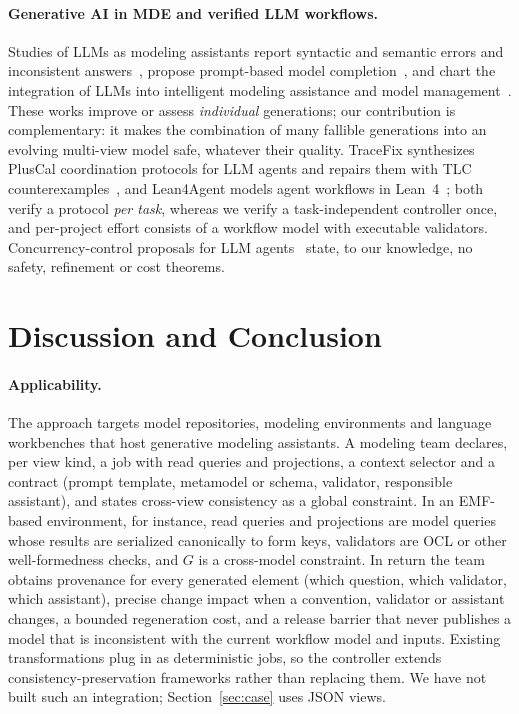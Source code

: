 \documentclass[pdflatex,sn-mathphys-num]{sn-jnl}
\theoremstyle{thmstyleone}%
\theoremstyle{thmstyletwo}%
\theoremstyle{thmstylethree}%
\begin{document}
\paragraph{Generative AI in MDE and verified LLM workflows.} Studies of LLMs as modeling assistants report syntactic and semantic errors and inconsistent answers~\cite{camara2023chatgpt}, propose prompt-based model completion~\cite{chaaben2023completion}, and chart the integration of LLMs into intelligent modeling assistance and model management~\cite{mussbacher2020assistance,dirocco2025llmmde}. These works improve or assess \emph{individual} generations; our contribution is complementary: it makes the combination of many fallible generations into an evolving multi-view model safe, whatever their quality. TraceFix synthesizes PlusCal coordination protocols for LLM agents and repairs them with TLC counterexamples~\cite{xia2026tracefix}, and Lean4Agent models agent workflows in Lean~4~\cite{wang2026lean4agent}; both verify a protocol \emph{per task}, whereas we verify a task-independent controller once, and per-project effort consists of a workflow model with executable validators. Concurrency-control proposals for LLM agents~\cite{yang2026concurrency,lyu2026coagent} state, to our knowledge, no safety, refinement or cost theorems.

\section{Discussion and Conclusion}\label{sec:conclusion}
\paragraph{Applicability.} The approach targets model repositories, modeling environments and language workbenches that host generative modeling assistants. A modeling team declares, per view kind, a job with read queries and projections, a context selector and a contract (prompt template, metamodel or schema, validator, responsible assistant), and states cross-view consistency as a global constraint. In an EMF-based environment, for instance, read queries and projections are model queries whose results are serialized canonically to form keys, validators are OCL or other well-formedness checks, and $G$ is a cross-model constraint. In return the team obtains provenance for every generated element (which question, which validator, which assistant), precise change impact when a convention, validator or assistant changes, a bounded regeneration cost, and a release barrier that never publishes a model that is inconsistent with the current workflow model and inputs. Existing transformations plug in as deterministic jobs, so the controller extends consistency-preservation frameworks rather than replacing them. We have not built such an integration; Section~\ref{sec:case} uses JSON views.
\end{document}

